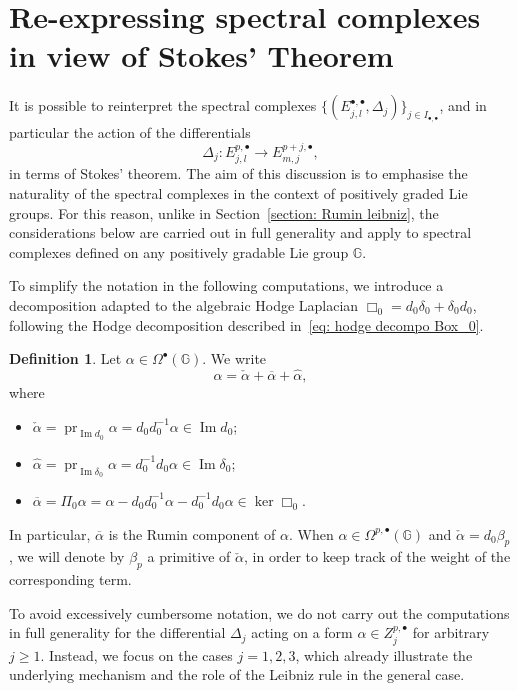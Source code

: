 \documentclass[dvipsnames]{amsart}
\theoremstyle{definition}
\newtheorem{definition}[theorem]{Definition}
\theoremstyle{definition}
\numberwithin{equation}{section}
\begin{document}
\section{Re-expressing spectral complexes in view of Stokes' Theorem}\label{section: spectral Leibniz}
It is possible to reinterpret the spectral complexes $\{(E_{j,l}^{\bullet,\bullet},\Delta_j)\}_{j\in I_{\bullet,\bullet}}$, and in particular the action of the differentials
\[
\Delta_j\colon E_{j,l}^{p,\bullet}\longrightarrow E_{m,j}^{p+j,\bullet},
\]
in terms of Stokes' theorem. The aim of this discussion is to emphasise the naturality of the spectral complexes in the context of positively graded Lie groups. For this reason, unlike in Section~\ref{section: Rumin leibniz}, the considerations below are carried out in full generality and apply to spectral complexes defined on any positively gradable Lie group $\mathbb{G}$.

\medskip

To simplify the notation in the following computations, we introduce a decomposition adapted to the algebraic Hodge Laplacian $\Box_0=d_0\delta_0+\delta_0 d_0$, following the Hodge decomposition described in~\eqref{eq: hodge decompo Box_0}.

\begin{definition}
Let $\alpha\in\Omega^\bullet(\mathbb{G})$. We write
\[
\alpha=\check{\alpha}+\overline{\alpha}+\hat{\alpha},
\]
where
\begin{itemize}
    \item $\check{\alpha}=\operatorname{pr}_{\operatorname{Im}d_0}\alpha = d_0 d_0^{-1}\alpha \in \operatorname{Im} d_0$;
    \item $\hat{\alpha}=\operatorname{pr}_{\operatorname{Im}\delta_0}\alpha = d_0^{-1} d_0 \alpha \in \operatorname{Im} \delta_0$;
    \item $\overline{\alpha}=\Pi_0 \alpha = \alpha - d_0 d_0^{-1}\alpha - d_0^{-1} d_0 \alpha \in \ker \Box_0$.
\end{itemize}
In particular, $\overline{\alpha}$ is the Rumin component of $\alpha$.
When $\alpha\in\Omega^{p,\bullet}(\mathbb{G})$ and $\check{\alpha}=d_0\beta_p$, we will denote by $\beta_p$ a primitive of $\check{\alpha}$, in order to keep track of the weight of the corresponding term.
\end{definition}
To avoid excessively cumbersome notation, we do not carry out the computations in full generality for the differential $\Delta_j$ acting on a form $\alpha\in Z_j^{p,\bullet}$ for arbitrary $j\ge 1$. Instead, we focus on the cases $j=1,2,3$, which already illustrate the underlying mechanism and the role of the Leibniz rule in the general case.
\end{document}

